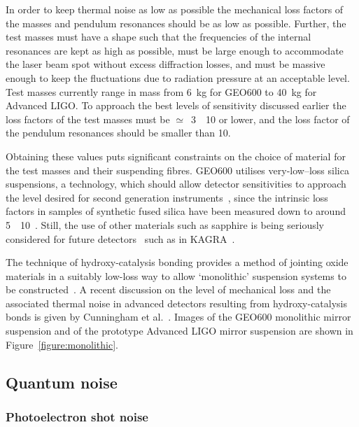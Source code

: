 In order to keep thermal noise as low as possible the mechanical loss factors of
the masses and pendulum resonances should be as low as possible. Further, the
test masses must have a shape such that the frequencies of the internal
resonances are kept as high as possible, must be large enough to accommodate the
laser beam spot without excess diffraction losses, and must be massive enough to
keep the fluctuations due to radiation pressure at an acceptable level. Test
masses currently range in mass from 6~kg for GEO600 to 40~kg for Advanced LIGO.
To approach the best levels of sensitivity discussed earlier the loss factors of
the test masses must be $\simeq$~3~\texttimes~10 or lower,
and the loss factor of the pendulum resonances should be smaller than
10.


Obtaining these values puts significant constraints on the choice of material
for the test masses and their suspending fibres. GEO600 utilises very-low--loss
silica suspensions, a technology, which should allow detector sensitivities to
approach the level desired for second generation instruments~\cite{Braginsky1,
Rowan1, Rowan2}, since the intrinsic loss factors in samples of synthetic fused
silica have been measured down to around
5~\texttimes~10~\cite{Ageev:2004}. Still, the use of other
materials such as sapphire is being seriously considered for future
detectors~\cite{Braginsky2, Ju2, Rowan1} such as in
KAGRA~\cite{Miyoki:2005, Ohashi:2008}.


The technique of hydroxy-catalysis bonding provides a method of jointing oxide
materials in a suitably low-loss way to allow `monolithic' suspension systems to
be constructed~\cite{Rowan3}. A recent discussion on the level of mechanical
loss and the associated thermal noise in advanced detectors resulting from
hydroxy-catalysis bonds is given by Cunningham et al.~\cite{Cunningham:2010}.
Images of the GEO600 monolithic mirror suspension and of the prototype Advanced
LIGO mirror suspension are shown in Figure~\ref{figure:monolithic}.\subsection{Quantum noise}
\label{subsection:quantumnoise} 

\subsubsection{Photoelectron shot noise}
\label{subsubsection:shotnoise} 

